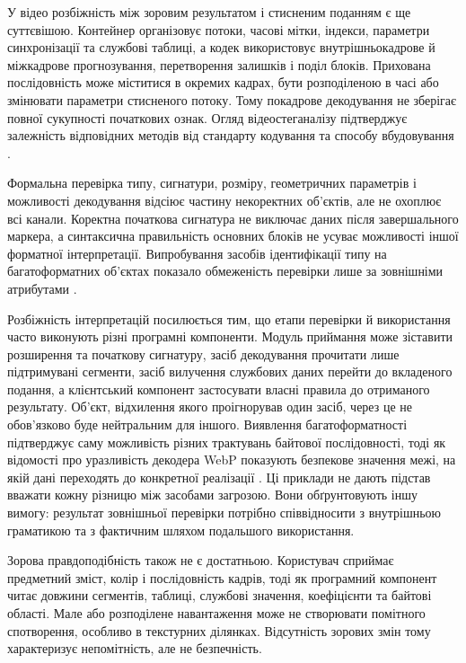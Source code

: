 У відео розбіжність між зоровим результатом і стисненим поданням є ще суттєвішою. Контейнер організовує потоки, часові мітки, індекси, параметри синхронізації та службові таблиці, а кодек використовує внутрішньокадрове й міжкадрове прогнозування, перетворення залишків і поділ блоків. Прихована послідовність може міститися в окремих кадрах, бути розподіленою в часі або змінювати параметри стисненого потоку. Тому покадрове декодування не зберігає повної сукупності початкових ознак. Огляд відеостеганалізу підтверджує залежність відповідних методів від стандарту кодування та способу вбудовування \cite{bouzegza2022video}.

Формальна перевірка типу, сигнатури, розміру, геометричних параметрів і можливості декодування відсіює частину некоректних об’єктів, але не охоплює всі канали. Коректна початкова сигнатура не виключає даних після завершального маркера, а синтаксична правильність основних блоків не усуває можливості іншої форматної інтерпретації. Випробування засобів ідентифікації типу на багатоформатних об’єктах показало обмеженість перевірки лише за зовнішніми атрибутами \cite{koch2022polyglot}.

Розбіжність інтерпретацій посилюється тим, що етапи перевірки й використання часто виконують різні програмні компоненти. Модуль приймання може зіставити розширення та початкову сигнатуру, засіб декодування прочитати лише підтримувані сегменти, засіб вилучення службових даних перейти до вкладеного подання, а клієнтський компонент застосувати власні правила до отриманого результату. Об’єкт, відхилення якого проігнорував один засіб, через це не обов’язково буде нейтральним для іншого. Виявлення багатоформатності підтверджує саму можливість різних трактувань байтової послідовності, тоді як відомості про уразливість декодера WebP показують безпекове значення межі, на якій дані переходять до конкретної реалізації \cite{koch2022polyglot,nvd2023webp}. Ці приклади не дають підстав вважати кожну різницю між засобами загрозою. Вони обґрунтовують іншу вимогу: результат зовнішньої перевірки потрібно співвідносити з внутрішньою граматикою та з фактичним шляхом подальшого використання.

Зорова правдоподібність також не є достатньою. Користувач сприймає предметний зміст, колір і послідовність кадрів, тоді як програмний компонент читає довжини сегментів, таблиці, службові значення, коефіцієнти та байтові області. Мале або розподілене навантаження може не створювати помітного спотворення, особливо в текстурних ділянках. Відсутність зорових змін тому характеризує непомітність, але не безпечність.

